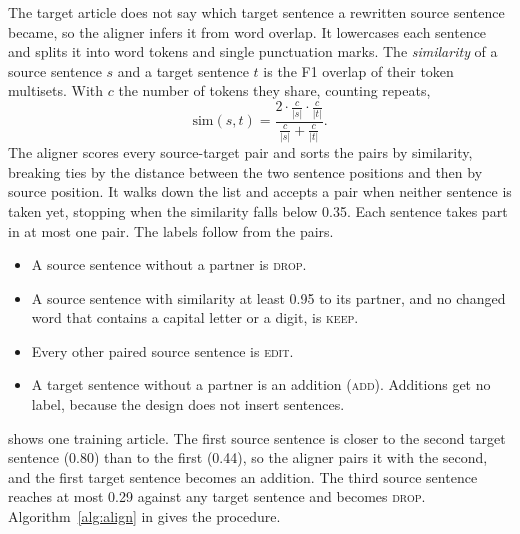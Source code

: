 \documentclass[]{paper}
\newcommand{\keep}{\textsc{keep}}
\newcommand{\edit}{\textsc{edit}}
\newcommand{\drop}{\textsc{drop}}
\newcommand{\add}{\textsc{add}}
\begin{document}
The target article does not say which target sentence a rewritten source sentence became, so the aligner infers it from word overlap. It lowercases each sentence and splits it into word tokens and single punctuation marks. The \emph{similarity} of a source sentence $s$ and a target sentence $t$ is the F1 overlap of their token multisets. With $c$ the number of tokens they share, counting repeats,
\[
\text{sim}(s, t) = \frac{2 \cdot \frac{c}{|s|} \cdot \frac{c}{|t|}}{\frac{c}{|s|} + \frac{c}{|t|}}.
\]
The aligner scores every source-target pair and sorts the pairs by similarity, breaking ties by the distance between the two sentence positions and then by source position. It walks down the list and accepts a pair when neither sentence is taken yet, stopping when the similarity falls below 0.35. Each sentence takes part in at most one pair. The labels follow from the pairs.

\begin{itemize}
\item A source sentence without a partner is \drop{}.
\item A source sentence with similarity at least 0.95 to its partner, and no changed word that contains a capital letter or a digit, is \keep{}.
\item Every other paired source sentence is \edit{}.
\item A target sentence without a partner is an addition (\add{}). Additions get no label, because the design does not insert sentences.
\end{itemize}

 shows one training article. The first source sentence is closer to the second target sentence (0.80) than to the first (0.44), so the aligner pairs it with the second, and the first target sentence becomes an addition. The third source sentence reaches at most 0.29 against any target sentence and becomes \drop{}. Algorithm~\ref{alg:align} in  gives the procedure.
\end{document}
